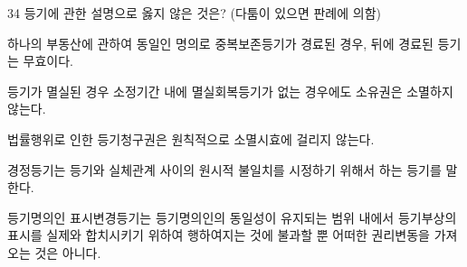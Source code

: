 \begin{question}{34}
등기에 관한 설명으로 옳지 않은 것은? (다툼이 있으면 판례에 의함)
\begin{choices}
  \item 하나의 부동산에 관하여 동일인 명의로 중복보존등기가 경료된 경우, 뒤에 경료된 등기는 무효이다.
  \item 등기가 멸실된 경우 소정기간 내에 멸실회복등기가 없는 경우에도 소유권은 소멸하지 않는다.
  \item 법률행위로 인한 등기청구권은 원칙적으로 소멸시효에 걸리지 않는다.
  \item 경정등기는 등기와 실체관계 사이의 원시적 불일치를 시정하기 위해서 하는 등기를 말한다.
  \item 등기명의인 표시변경등기는 등기명의인의 동일성이 유지되는 범위 내에서 등기부상의 표시를 실제와 합치시키기 위하여 행하여지는 것에 불과할 뿐 어떠한 권리변동을 가져오는 것은 아니다.
\end{choices}
\end{question}
